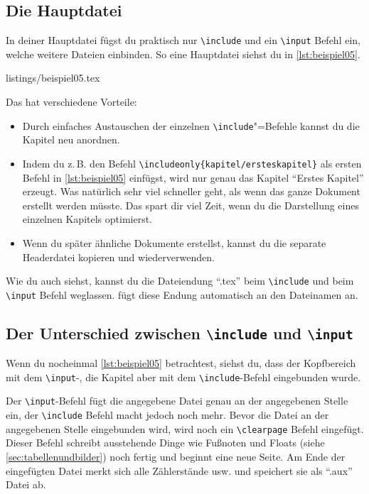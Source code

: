 \subsection{Die Hauptdatei}

In deiner Hauptdatei fügst du praktisch nur \texttt{\textbackslash include} und ein \texttt{\textbackslash input} Befehl ein, welche weitere Dateien einbinden. So eine Hauptdatei siehst du in \cref{lst:beispiel05}.

%
	{listings/beispiel05.tex}

Das hat verschiedene Vorteile:

\begin{itemize}
	\item Durch einfaches Austauschen der einzelnen \texttt{\textbackslash include}"=Befehle kannst du die Kapitel neu anordnen.
	\item Indem du z.\,B. den Befehl \texttt{\textbackslash includeonly\{kapitel/ersteskapitel\}} als ersten Befehl in \cref{lst:beispiel05} einfügst, wird nur genau das Kapitel \enquote{Erstes Kapitel} erzeugt. Was natürlich sehr viel schneller geht, als wenn das ganze Dokument erstellt werden müsste. Das spart dir viel Zeit, wenn du die Darstellung eines einzelnen Kapitels optimierst.
	\item Wenn du später ähnliche Dokumente erstellst, kannst du die separate Headerdatei kopieren und wiederverwenden.
\end{itemize}

Wie du auch siehst, kannst du die Dateiendung \enquote{.tex} beim \texttt{\textbackslash include} und beim \texttt{\textbackslash input} Befehl weglassen. \DMLLaTeX{} fügt diese Endung automatisch an den Dateinamen an.

\subsection{Der Unterschied zwischen \texttt{\textbackslash include} und \texttt{\textbackslash input}}

Wenn du nocheinmal \cref{lst:beispiel05} betrachtest, siehst du, dass der Kopfbereich mit dem \texttt{\textbackslash input}-, die Kapitel aber mit dem \texttt{\textbackslash include}-Befehl eingebunden wurde.

Der \texttt{\textbackslash input}-Befehl fügt die angegebene Datei genau an der angegebenen Stelle ein, der \texttt{\textbackslash include} Befehl macht jedoch noch mehr. Bevor die Datei an der angegebenen Stelle eingebunden wird, wird noch ein \texttt{\textbackslash clearpage} Befehl eingefügt. Dieser Befehl schreibt ausstehende Dinge wie Fußnoten und Floats (siehe \cref{sec:tabellenundbilder}) noch fertig und beginnt eine neue Seite. Am Ende der eingefügten Datei merkt sich \DMLLaTeX{} alle Zählerstände usw. und speichert sie als \enquote{.aux} Datei ab.


